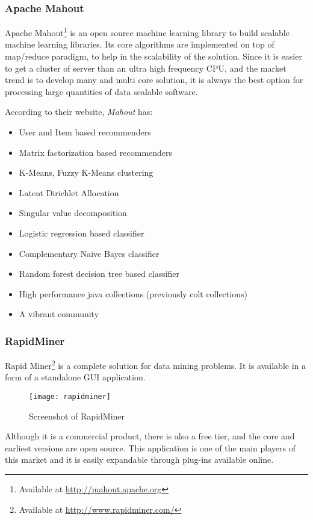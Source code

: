 \subsubsection{Apache Mahout}

Apache Mahout\footnote{ Available at \url{http://mahout.apache.org}} is an open source machine learning library to build scalable machine learning libraries.
Its core algorithms are implemented on top of map/reduce paradigm, to help in the scalability of the solution.
Since it is easier to get a cluster of server than an ultra high frequency CPU, and the market trend is to develop many and multi core solution, it is always the best option for processing large quantities of data scalable software.

According to their website, \emph{Mahout} has:
\begin{itemize}

\item User and Item based recommenders
\item Matrix factorization based recommenders
\item K-Means, Fuzzy K-Means clustering
\item Latent Dirichlet Allocation
\item Singular value decomposition
\item Logistic regression based classifier
\item Complementary Naive Bayes classifier
\item Random forest decision tree based classifier
\item High performance java collections (previously colt collections)
\item  A vibrant community

\end{itemize}

\subsubsection{RapidMiner}

Rapid Miner\footnote{ Available at \url{http://www.rapidminer.com/}} is a complete solution for data mining problems. It is available in a form of
a standalone GUI application.
\begin{figure}[h]
  \begin{center}
    \leavevmode
    \texttt{[image: rapidminer]}
    \caption{Screenshot of RapidMiner \protect\footnotemark}
    \label{fig:RapidMiner}
  \end{center}
\end{figure}
 Although it is a commercial product, there is also a free tier, and the core and earliest versions are open source. This application
is one of the main players of this market and it is easily expandable through plug-ins available online.

